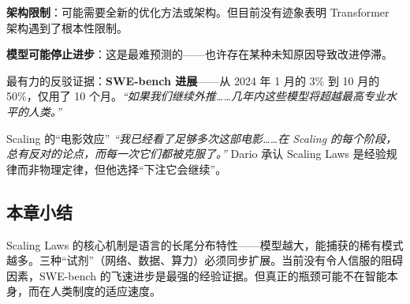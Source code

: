 \textbf{架构限制}：可能需要全新的优化方法或架构。但目前没有迹象表明 Transformer 架构遇到了根本性限制。

\textbf{模型可能停止进步}：这是最难预测的——也许存在某种未知原因导致改进停滞。

最有力的反驳证据：\textbf{SWE-bench 进展}——从 2024 年 1 月的 3\% 到 10 月的 50\%，仅用了 10 个月。\textit{``如果我们继续外推……几年内这些模型将超越最高专业水平的人类。''}

\begin{importantbox}{Scaling 的``电影效应''}
\textit{``我已经看了足够多次这部电影……在 Scaling 的每个阶段，总有反对的论点，而每一次它们都被克服了。''} Dario 承认 Scaling Laws 是经验规律而非物理定律，但他选择``下注它会继续''。
\end{importantbox}

\subsection{本章小结}

Scaling Laws 的核心机制是语言的长尾分布特性——模型越大，能捕获的稀有模式越多。三种``试剂''（网络、数据、算力）必须同步扩展。当前没有令人信服的阻碍因素，SWE-bench 的飞速进步是最强的经验证据。但真正的瓶颈可能不在智能本身，而在人类制度的适应速度。

